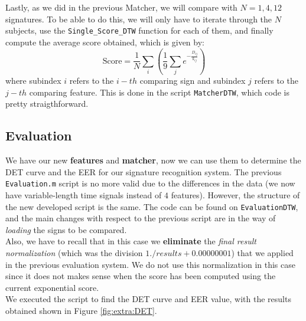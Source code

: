 \documentclass[a4paper]{article}
\def\inline{\lstinline[basicstyle=\ttfamily,keywordstyle={}]}
\begin{document}
{Lastly, as we did in the previous Matcher, we will compare with \(N=1,4,12\) signatures. To be able to do this, we will only have to iterate through the \(N\) subjects, use the \inline{Single_Score_DTW} function for each of them, and finally compute the average score obtained, which is given by:
\[
\text{Score} = \frac{1}{N}\sum_{i} \left( \frac{1}{9}\sum_{j} e^{-\frac{D_{ij}}{k_{ij}}}\right)
\]
where subindex \(i\) refers to the \(i-th\) comparing sign and subindex \(j\) refers to the \(j-th\) comparing feature. This is done in the script \inline{MatcherDTW}, which code is pretty straigthforward.


\subsection*{Evaluation}

We have our new \textbf{features} and \textbf{matcher}, now we can use them to determine the DET curve and the EER for our signature recognition system. The previous \inline{Evaluation.m} script is no more valid due to the differences in the data (we now have variable-length time signals instead of \(4\)
features). However, the structure of the new developed script is the same.  The code can be found on \inline{EvaluationDTW}, and the main changes with respect to the previous script are in the way of \emph{loading} the signs to be compared.\\

Also, we have to recall that in this case we \textbf{eliminate} the \emph{final result normalization} (which was the division \(1./ results + 0.00000001\)) that we applied in the previous evaluation system. We do not use this normalization in this case since it does not makes sense when the score has been computed using the current exponential score.\\

We executed the script to find the DET curve and EER value, with the results obtained shown in Figure \ref{fig:extra:DET}.

}
\end{document}

